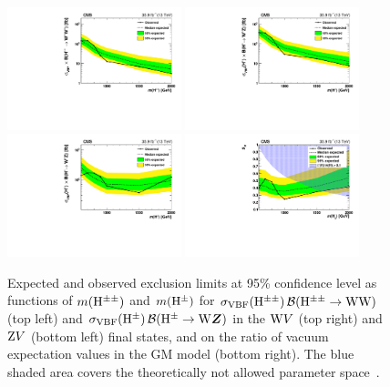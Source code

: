 \begin{figure}[!htbp]
\centering
\includegraphics[width=0.45\textwidth]{Plots/plots/limits_wpwp.pdf}
\includegraphics[width=0.45\textwidth]{Plots/plots/limits_wpz_lnu.pdf}
\includegraphics[width=0.45\textwidth]{Plots/plots/limits_wpz_ll.pdf}
\includegraphics[width=0.45\textwidth]{Plots/plots/limits_model.pdf}
\caption{Expected and observed exclusion limits at 95\% confidence level as functions of $m(\mathrm{H^{\pm\pm}})$ and $m(\mathrm{H}^{\pm})$ for $\sigma_\mathrm{VBF}(\mathrm{H^{\pm\pm}}) \, \mathcal{B}(\mathrm{H^{\pm\pm}}\to \mathrm{W}\mathrm{W})$ (top left) and $\sigma_\mathrm{VBF}(\mathrm{H}^{\pm}) \, \mathcal{B}(\mathrm{H}^{\pm}\to \mathrm{W}\boldsymbol{Z})$ in the  $\mathrm{W} V$ (top right) and $\mathrm{Z} V$ (bottom left) final states, and on the ratio of vacuum expectation values in the GM model (bottom right). The blue shaded area covers the theoretically not allowed parameter space~\cite{Zaro:2002500}.
}
\label{fig:limits_s}
\end{figure}

